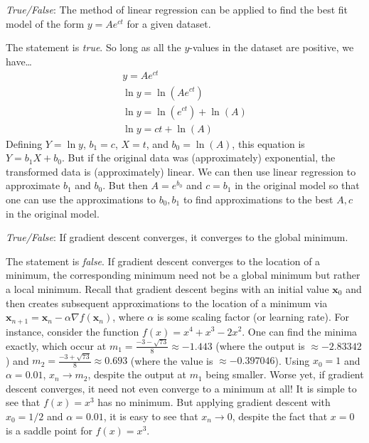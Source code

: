 \documentclass[11pt,letterpaper]{article}
\begin{document}
\quizsol \textit{True/False}: The method of linear regression can be applied to find the best fit model of the form $y= Ae^{ct}$ for a given dataset. \pspace

\sol The statement is \textit{true}. So long as all the $y$-values in the dataset are positive, we have\dots
	\[
	\begin{gathered}
	y= Ae^{ct} \\[0.3cm]
	\ln y = \ln \left( A e^{ct} \right) \\[0.3cm]
	\ln y = \ln \left( e^{ct} \right) + \ln(A) \\[0.3cm]
	\ln y = ct + \ln(A)
	\end{gathered}
	\]
Defining $Y= \ln y$, $b_1= c$, $X= t$, and $b_0= \ln(A)$, this equation is $Y= b_1 X + b_0$. But if the original data was (approximately) exponential, the transformed data is (approximately) linear. We can then use linear regression to approximate $b_1$ and $b_0$. But then $A= e^{b_0}$ and $c= b_1$ in the original model so that one can use the approximations to $b_0, b_1$ to find approximations to the best $A, c$ in the original model. \pvspace{1.3cm}



\quizsol \textit{True/False}: If gradient descent converges, it converges to the global minimum. \pspace

\sol The statement is \textit{false}. If gradient descent converges to the location of a minimum, the corresponding minimum need not be a global minimum but rather a local minimum. Recall that gradient descent begins with an initial value $\mathbf{x}_0$ and then creates subsequent approximations to the location of a minimum via $\mathbf{x}_{n+1}= \mathbf{x}_n - \alpha \nabla f(\mathbf{x}_n)$, where $\alpha$ is some scaling factor (or learning rate). For instance, consider the function $f(x)= x^4 + x^3 - 2x^2$. One can find the minima exactly, which occur at $m_1= \frac{-3 - \sqrt{73}}{8} \approx -1.443$ (where the output is $\approx -2.83342$) and $m_2= \frac{-3 + \sqrt{73}}{8} \approx 0.693$ (where the value is $\approx -0.397046$). Using $x_0= 1$ and $\alpha= 0.01$, $x_n \to m_2$, despite the output at $m_1$ being smaller. Worse yet, if gradient descent converges, it need not even converge to a minimum at all! It is simple to see that $f(x)= x^3$ has no minimum. But applying gradient descent with $x_0= 1/2$ and $\alpha= 0.01$, it is easy to see that $x_n \to 0$, despite the fact that $x= 0$ is a saddle point for $f(x)= x^3$. 
\end{document}
